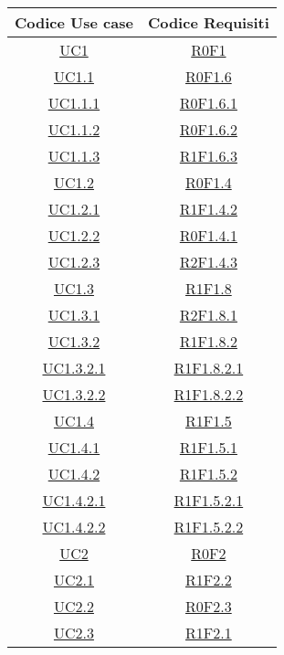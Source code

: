 \begin{longtable}{|c|c|}
\hline
\textbf{Codice Use case} & \textbf{Codice Requisiti} \\
\hline
\endhead
\hyperlink{UC1}{UC1} & \hyperlink{R0F1}{R0F1}\\
\hline
\hyperlink{UC1.1}{UC1.1} & \hyperlink{R0F1.6}{R0F1.6}\\
\hline
\hyperlink{UC1.1.1}{UC1.1.1} & \hyperlink{R0F1.6.1}{R0F1.6.1}\\
\hline
\hyperlink{UC1.1.2}{UC1.1.2} & \hyperlink{R0F1.6.2}{R0F1.6.2}\\
\hline
\hyperlink{UC1.1.3}{UC1.1.3} & \hyperlink{R1F1.6.3}{R1F1.6.3}\\
\hline
\hyperlink{UC1.2}{UC1.2} & \hyperlink{R0F1.4}{R0F1.4}\\
\hline
\hyperlink{UC1.2.1}{UC1.2.1} & \hyperlink{R1F1.4.2}{R1F1.4.2}\\
\hline
\hyperlink{UC1.2.2}{UC1.2.2} & \hyperlink{R0F1.4.1}{R0F1.4.1}\\
\hline
\hyperlink{UC1.2.3}{UC1.2.3} & \hyperlink{R2F1.4.3}{R2F1.4.3}\\
\hline
\hyperlink{UC1.3}{UC1.3} & \hyperlink{R1F1.8}{R1F1.8}\\
\hline
\hyperlink{UC1.3.1}{UC1.3.1} & \hyperlink{R2F1.8.1}{R2F1.8.1}\\
\hline
\hyperlink{UC1.3.2}{UC1.3.2} & \hyperlink{R1F1.8.2}{R1F1.8.2}\\
\hline
\hyperlink{UC1.3.2.1}{UC1.3.2.1} & \hyperlink{R1F1.8.2.1}{R1F1.8.2.1}\\
\hline
\hyperlink{UC1.3.2.2}{UC1.3.2.2} & \hyperlink{R1F1.8.2.2}{R1F1.8.2.2}\\
\hline
\hyperlink{UC1.4}{UC1.4} & \hyperlink{R1F1.5}{R1F1.5}\\
\hline
\hyperlink{UC1.4.1}{UC1.4.1} & \hyperlink{R1F1.5.1}{R1F1.5.1}\\
\hline
\hyperlink{UC1.4.2}{UC1.4.2} & \hyperlink{R1F1.5.2}{R1F1.5.2}\\
\hline
\hyperlink{UC1.4.2.1}{UC1.4.2.1} & \hyperlink{R1F1.5.2.1}{R1F1.5.2.1}\\
\hline
\hyperlink{UC1.4.2.2}{UC1.4.2.2} & \hyperlink{R1F1.5.2.2}{R1F1.5.2.2}\\
\hline
\hyperlink{UC2}{UC2} & \hyperlink{R0F2}{R0F2}\\
\hline
\hyperlink{UC2.1}{UC2.1} & \hyperlink{R1F2.2}{R1F2.2}\\
\hline
\hyperlink{UC2.2}{UC2.2} & \hyperlink{R0F2.3}{R0F2.3}\\
\hline
\hyperlink{UC2.3}{UC2.3} & \hyperlink{R1F2.1}{R1F2.1}\\

\end{longtable}
